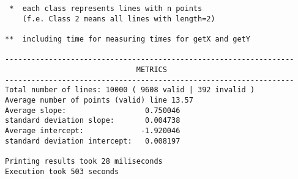 \begin{verbatim}
 *  each class represents lines with n points 
    (f.e. Class 2 means all lines with length=2)

**  including time for measuring times for getX and getY

------------------------------------------------------------------
                              METRICS                             
------------------------------------------------------------------
Total number of lines: 10000 ( 9608 valid | 392 invalid ) 
Average number of points (valid) line 13.57 
Average slope:                  0.750046      
standard deviation slope:       0.004738 
Average intercept:             -1.920046  
standard deviation intercept:   0.008197 

Printing results took 28 miliseconds
Execution took 503 seconds
\end{verbatim}
